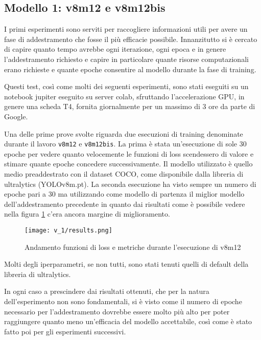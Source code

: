\subsection*{Modello 1: v8m12 e v8m12bis}

I primi esperimenti sono serviti per raccogliere informazioni utili per avere un fase di 
addestramento che fosse il più efficacie possibile. Innanzitutto si è cercato di capire quanto
tempo avrebbe ogni iterazione, ogni epoca e in genere l'addestramento richiesto e capire 
in particolare quante risorse computazionali erano richieste e quante epoche consentire
al modello durante la fase di training.

Questi test, così come molti dei seguenti esperimenti, sono stati eseguiti su un notebook
jupiter eseguito su server colab, sfruttando l'accelerazione GPU, in genere una scheda T4, 
fornita giornalmente per un massimo di 3 ore da parte di Google.


Una delle prime prove svolte riguarda due esecuzioni di training denominate durante il lavoro
\verb+v8m12+ e \verb+v8m12bis+. La prima è stata un'esecuzione di sole 30 epoche per vedere quanto 
velocemente le funzioni di loss scendessero di valore e stimare quante epoche concedere successivamente.
Il modello utilizzato è quello medio preaddestrato con il dataset COCO, come disponibile dalla libreria 
di ultralytics (YOLOv8m.pt).
La seconda esecuzione ha visto sempre un numero di epoche pari a 30 ma utilizzando come modello di
partenza il miglior modello dell'addestramento precedente in quanto dai risultati come è possibile vedere 
nella figura \ref{fig:v1-1} c'era ancora margine di miglioramento.

\begin{figure}[h]
    \centering
    \texttt{[image: v\_1/results.png]}
    \caption{Andamento funzioni di loss e metriche durante l'esecuzione di v8m12}
    \label{fig:v1-1}
    \end{figure}

Molti degli iperparametri, se non tutti, sono stati tenuti quelli di default della libreria di ultralytics.



In ogni caso a prescindere dai risultati ottenuti, che per la natura dell'esperimento non sono
fondamentali, si è visto come il numero di epoche necessario per 
l'addestramento dovrebbe essere molto più alto per poter raggiungere quanto meno un'efficacia del modello
accettabile, così come è stato fatto poi per gli esperimenti successivi.